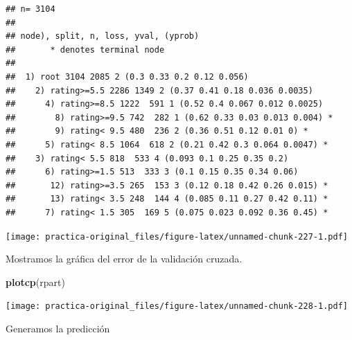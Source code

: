\documentclass[spanish,]{article}
\newenvironment{Shaded}{\begin{snugshade}}{\end{snugshade}}
\newcommand{\KeywordTok}[1]{\textcolor[rgb]{0.13,0.29,0.53}{\textbf{#1}}}
\newcommand{\DataTypeTok}[1]{\textcolor[rgb]{0.13,0.29,0.53}{#1}}
\newcommand{\StringTok}[1]{\textcolor[rgb]{0.31,0.60,0.02}{#1}}
\newcommand{\CommentTok}[1]{\textcolor[rgb]{0.56,0.35,0.01}{\textit{#1}}}
\newcommand{\OperatorTok}[1]{\textcolor[rgb]{0.81,0.36,0.00}{\textbf{#1}}}
\newcommand{\NormalTok}[1]{#1}
\begin{document}
\begin{verbatim}
## n= 3104 
## 
## node), split, n, loss, yval, (yprob)
##       * denotes terminal node
## 
##  1) root 3104 2085 2 (0.3 0.33 0.2 0.12 0.056)  
##    2) rating>=5.5 2286 1349 2 (0.37 0.41 0.18 0.036 0.0035)  
##      4) rating>=8.5 1222  591 1 (0.52 0.4 0.067 0.012 0.0025)  
##        8) rating>=9.5 742  282 1 (0.62 0.33 0.03 0.013 0.004) *
##        9) rating< 9.5 480  236 2 (0.36 0.51 0.12 0.01 0) *
##      5) rating< 8.5 1064  618 2 (0.21 0.42 0.3 0.064 0.0047) *
##    3) rating< 5.5 818  533 4 (0.093 0.1 0.25 0.35 0.2)  
##      6) rating>=1.5 513  333 3 (0.1 0.15 0.35 0.34 0.06)  
##       12) rating>=3.5 265  153 3 (0.12 0.18 0.42 0.26 0.015) *
##       13) rating< 3.5 248  144 4 (0.085 0.11 0.27 0.42 0.11) *
##      7) rating< 1.5 305  169 5 (0.075 0.023 0.092 0.36 0.45) *
\end{verbatim}

\begin{Shaded}
\end{Shaded}

\texttt{[image: practica-original\_files/figure-latex/unnamed-chunk-227-1.pdf]}

Mostramos la gráfica del error de la validación cruzada.

\begin{Shaded}
\begin{Highlighting}[]
\KeywordTok{plotcp}\NormalTok{(rpart)}
\end{Highlighting}
\end{Shaded}

\texttt{[image: practica-original\_files/figure-latex/unnamed-chunk-228-1.pdf]}

Generamos la predicción

\begin{Shaded}
\end{Shaded}
\end{document}
